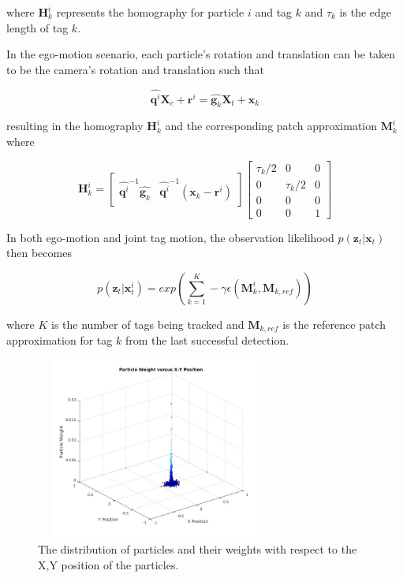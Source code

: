 \documentclass[letterpaper, 10 pt, conference]{ieeeconf}
\renewcommand{\vec}[1]{\boldsymbol{#1}}
\begin{document}
where $\vec{H}^i_k$ represents the homography for particle $i$ and tag $k$ and $\tau_k$ is the edge length of tag $k$.


In the ego-motion scenario, each particle's rotation and translation can be taken to be the camera's rotation and  translation such that

\begin{equation}
	\widehat{\vec{q}^i}\vec{X}_c + \vec{r}^i = \widehat{\vec{g}_k} \vec{X}_t + \vec{x}_k
\end{equation}

resulting in the homography $\vec{H}^i_k$ and the corresponding patch approximation $\vec{M}^i_k$ where

\begin{equation}
	\vec{H}^i_k = \begin{bmatrix}
		\widehat{\vec{q}^i}^{-1} \widehat{\vec{g}_k} & \widehat{\vec{q}^i}^{-1} (\vec{x}_k - \vec{r}^i)
	\end{bmatrix} \begin{bmatrix}
		\tau_k/2 & 0 & 0 \\
		0 & \tau_k/2 & 0 \\
		0 & 0 & 0 \\
		0 & 0 & 1
	\end{bmatrix}
\end{equation}


In both ego-motion and joint tag motion, the observation likelihood $p(\vec{z}_t|\vec{x}_{t})$ then becomes

\begin{equation}
	p(\vec{z}_t|\vec{x}^i_{t}) = exp(\sum^{K}_{k=1} -\gamma \epsilon(\vec{M}^i_k, \vec{M}_{k, ref}))
\end{equation}

where $K$ is the number of tags being tracked and $\vec{M}_{k,ref}$ is the reference patch approximation for tag $k$ from the last successful detection.


\begin{figure}
	\centering
	\includegraphics[width=8cm,height=6cm]{Particles2}
	\caption{The distribution of particles and their weights with respect to the X,Y position of the particles.}
\end{figure}
\end{document}
